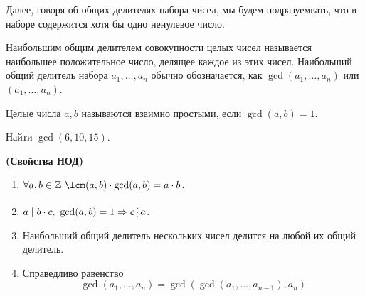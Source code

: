 \documentclass[11pt]{article}
\begin{document}
Далее, говоря об общих делителях набора чисел, мы будем подразуемвать, что в наборе содержится хотя бы одно ненулевое число.


\begin{definition}

	Наибольшим общим делителем совокупности целых чисел называется наибольшее положительное число, делящее каждое из этих чисел.
	Наибольший общий делитель набора $a_1, \ldots, a_n$ обычно обозначается, как $\gcd(a_1, \ldots, a_n)$ или $(a_1, \ldots, a_n)$.

\end{definition}

\begin{definition}
	Целые числа $a, b$ называются взаимно простыми, если $\gcd(a, b) = 1$.
\end{definition}

\begin{example}
    Найти $\gcd(6, 10, 15)$.
\end{example}

\begin{theorem} \textbf{(Свойства НОД)}
	\begin{enumerate}
	    \item $\forall a, b \in \mathbb{Z}\ \lcm(a, b) \cdot \gcd(a, b) = a \cdot b$.

		\item $a \mid b \cdot c, \ \gcd(a, b) = 1 \Rightarrow c \divisible a$.

		\item Наибольший общий делитель нескольких чисел делится на любой их общий делитель.

		\item Справедливо равенство
			  \[ \gcd(a_1, \ldots, a_n) = \gcd(\gcd(a_1, \ldots, a_{n - 1}), a_n)\]
	\end{enumerate}
\end{theorem}
\end{document}
